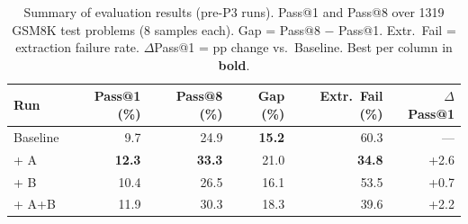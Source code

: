 \begin{table}[ht]
\centering
\caption{Summary of evaluation results (pre-P3 runs). Pass@1 and Pass@8 over 1319 GSM8K test problems (8 samples each). Gap = Pass@8 $-$ Pass@1. Extr.\ Fail = extraction failure rate. $\Delta$Pass@1 = pp change vs.\ Baseline. Best per column in \textbf{bold}.}
\label{tab:p4-summary}
\begin{tabular}{lrrrrr}
\toprule
Run & Pass@1 (\%) & Pass@8 (\%) & Gap (\%) & Extr.\ Fail (\%) & $\Delta$ Pass@1 \\
\midrule
Baseline & 9.7 & 24.9 & \textbf{15.2} & 60.3 & --- \\
\midrule
+ A & \textbf{12.3} & \textbf{33.3} & 21.0 & \textbf{34.8} & +2.6 \\
+ B & 10.4 & 26.5 & 16.1 & 53.5 & +0.7 \\
+ A+B & 11.9 & 30.3 & 18.3 & 39.6 & +2.2 \\
\midrule
\bottomrule
\end{tabular}
\end{table}
